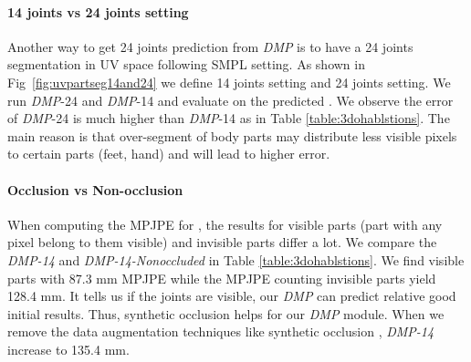\documentclass[10pt,twocolumn,letterpaper]{article}
\begin{document}
\paragraph{14 joints vs 24 joints setting} Another way to get 24 joints prediction from \textit{DMP} is to have a 24 joints segmentation  in UV space following SMPL setting. As shown in Fig~\ref{fig:uvpartseg14and24} we define 14 joints setting and 24 joints setting. We run \textit{DMP}-24 and  \textit{DMP}-14 and evaluate on the predicted . We observe the error of \textit{DMP}-24 is much higher than  \textit{DMP}-14 as in Table \ref{table:3dohablstions}. The main reason is that over-segment of body parts may distribute less visible pixels to certain parts (feet, hand) and will lead to  higher error.  



\paragraph{Occlusion vs Non-occlusion} When computing the MPJPE for , the results for visible parts (part with any pixel belong to them visible) and invisible parts  differ a lot. We compare the \textit{DMP-14} and \textit{DMP-14-Nonoccluded} in Table \ref{table:3dohablstions}. We find visible parts with 87.3 mm MPJPE while the MPJPE counting invisible parts yield 128.4 mm. It tells us if the joints are visible, our \textit{DMP} can predict relative good initial results. Thus, synthetic occlusion helps for  our \textit{DMP} module.
When we remove the data augmentation techniques like synthetic occlusion \cite{SyntheticOcclusion}, \textit{DMP-14} increase to 135.4 mm. 
\end{document}
